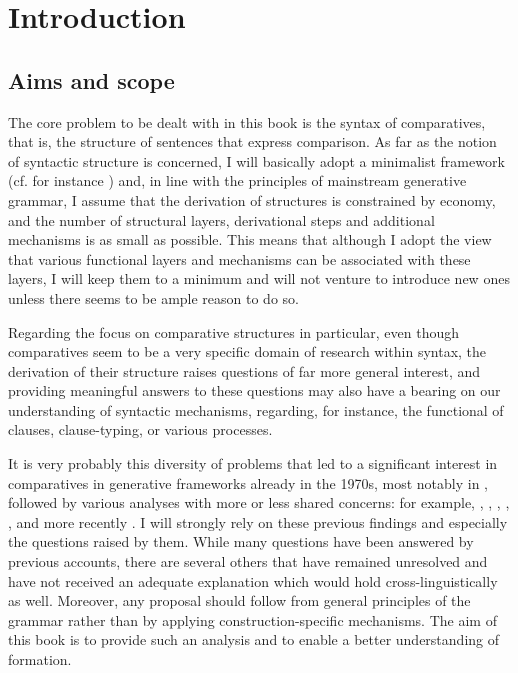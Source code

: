 \chapter{Introduction} \label{ch:1}
\section{Aims and scope} \label{sec:1introduction}
The core problem to be dealt with in this book is the syntax of comparatives, that is, the structure of sentences that express comparison. As far as the notion of syntactic structure is concerned, I will basically adopt a minimalist framework (cf. for instance \citealt{chomsky2001, chomsky2004, chomsky2008}) and, in line with the principles of mainstream generative grammar, I assume that the derivation of structures is constrained by economy, and the number of structural layers, derivational steps and additional mechanisms is as small as possible. This means that although I adopt the view that various functional layers and mechanisms can be associated with these layers, I will keep them to a minimum and will not venture to introduce new ones unless there seems to be ample reason to do so.

Regarding the focus on comparative structures in particular, even though comparatives seem to be a very specific domain of research within syntax, the derivation of their structure raises questions of far more general interest, and providing meaningful answers to these questions may also have a bearing on our understanding of syntactic mechanisms, regarding, for instance, the functional  of clauses, clause-typing, or various  processes.

It is very probably this diversity of problems that led to a significant interest in comparatives in generative frameworks already in the 1970s, most notably in \citet{bresnan1973, bresnan1975}, followed by various analyses with more or less shared concerns: for example, \citet{corver1993, corver1997}, \citet{izvorski1995}, \citet{lechner1999diss, lechner2004}, \citet{kennedy1997diss, kennedy1999, kennedy2002}, \citet{kennedymerchant1997, kennedymerchant2000}, and more recently \citet{reglero2006}. I will strongly rely on these previous findings and especially the questions raised by them. While many questions have been answered by previous accounts, there are several others that have remained unresolved and have not received an adequate explanation which would hold cross-linguistically as well. Moreover, any proposal should follow from general principles of the grammar rather than by applying construction-specific mechanisms. The aim of this book is to provide such an analysis and to enable a better understanding of  formation.

